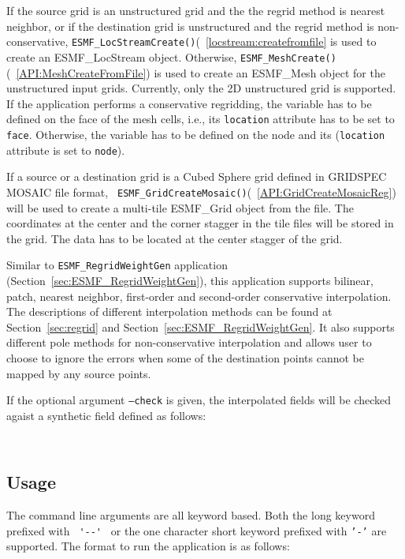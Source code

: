 If the source grid is an unstructured grid and the the regrid method is nearest neighbor, or if the destination grid 
is unstructured and the regrid method is non-conservative, {\tt ESMF\_LocStreamCreate()}(~\ref{locstream:createfromfile} is used to create an ESMF\_LocStream object.  Otherwise,
{\tt ESMF\_MeshCreate()}(~\ref{API:MeshCreateFromFile}) is used to create an ESMF\_Mesh object for the unstructured 
input grids.  Currently, only the 2D unstructured grid is supported.
If the application performs a conservative regridding, the variable has to be defined on the face of the mesh cells, i.e., its {\tt location} attribute has to be set to {\tt face}.  Otherwise, the variable has to be 
defined on the node and its ({\tt location} attribute is set to {\tt node}).

If a source or a destination grid is a Cubed Sphere grid defined in GRIDSPEC
MOSAIC file format, {\tt
  ESMF\_GridCreateMosaic()}(~\ref{API:GridCreateMosaicReg}) will be used to create a multi-tile ESMF\_Grid
object from the file.  The coordinates at the center and the corner stagger in
the tile files will be stored in the grid.  The data has to be located at the
center stagger of the grid.
 
Similar to {\tt ESMF\_RegridWeightGen} application (Section~\ref{sec:ESMF_RegridWeightGen}), this application supports
bilinear, patch, nearest neighbor, first-order and second-order conservative interpolation. The descriptions of different 
interpolation methods can be found at Section~\ref{sec:regrid} and Section~\ref{sec:ESMF_RegridWeightGen}. 
It also supports different pole methods for non-conservative interpolation and allows user to choose to 
ignore the errors when some of the destination points cannot be mapped by any source points. 

If the optional argument {\tt --check} is given, the interpolated fields will
be checked agaist a synthetic field defined as follows:

\begin{verbatim}
   
\end{verbatim}

\subsection{Usage}\label{sec:fileregridusage}

The command line arguments are all keyword based.  Both the long keyword prefixed with \verb+ '--' + or the
one character short keyword prefixed with {\tt '-'} are supported.  The format to run the application is
as follows:

